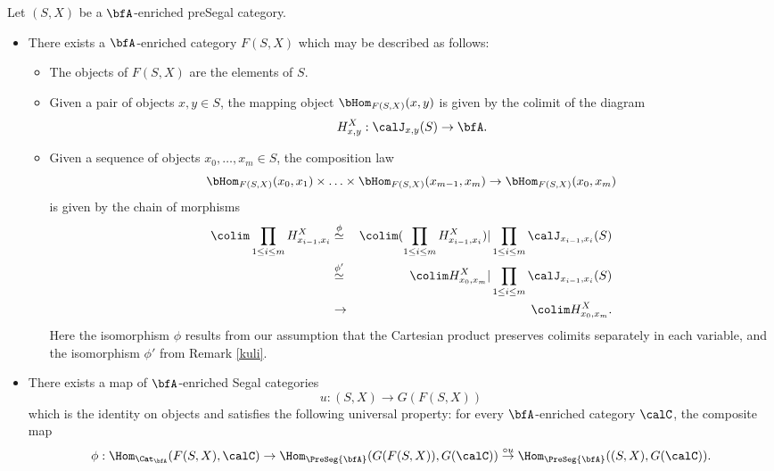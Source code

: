 \begin{proposition}\label{koon}
Let $(S,X)$ be a $\bfA$-enriched preSegal category. 
\begin{itemize}
\item[$(1)$] There exists a $\bfA$-enriched category
$F(S,X)$ which may be described as follows: 
\begin{itemize}
\item[$(a)$] The objects of $F(S,X)$ are the elements of $S$.
\item[$(b)$] Given a pair of objects $x,y \in S$, the mapping object
$\bHom_{F(S,X)}(x,y)$ is given by the colimit of the diagram
$$ H^{X}_{x,y}: \calJ_{x,y}(S) \rightarrow \bfA.$$
\item[$(c)$] Given a sequence of objects $x_0, \ldots, x_m \in S$, the composition law
$$ \bHom_{F(S,X)}(x_0, x_1) \times \ldots \times \bHom_{F(S,X)}(x_{m-1}, x_m)
\rightarrow \bHom_{ F(S,X)}( x_0, x_m)$$
is given by the chain of morphisms
\begin{align*}
\colim \prod_{1 \leq i \leq m} H^{X}_{x_{i-1}, x_i} & \stackrel{\phi}{\simeq} & 
\colim (\prod_{1 \leq i \leq m} H^{X}_{x_{i-1}, x_i}) | \prod_{1 \leq i \leq m} \calJ_{x_{i-1}, x_i}(S) \\
& \stackrel{\phi'}{\simeq} & \colim H^{X}_{x_0, x_m} | \prod_{ 1 \leq i \leq m} \calJ_{x_{i-1}, x_i}(S) \\
& \rightarrow & \colim H^{X}_{x_0, x_m}. \end{align*}
Here the isomorphism $\phi$ results from our assumption that the Cartesian product preserves colimits separately in each variable, and the isomorphism $\phi'$ from Remark \ref{kuli}.
\end{itemize}
\item[$(2)$] There exists a map of $\bfA$-enriched Segal categories
$$ u: (S,X) \rightarrow G( F(S,X) )$$ which is the identity on objects and satisfies the following universal property: for every $\bfA$-enriched category $\calC$,
the composite map
$$ \phi: \Hom_{ \Cat_{\bfA}}( F(S,X), \calC) \rightarrow \Hom_{ \PreSeg{\bfA}}( G( F(S,X) ), G(\calC) )
\stackrel{ \circ u}{\rightarrow} \Hom_{ \PreSeg{\bfA}}( (S,X), G(\calC) ).$$
\end{itemize}
\end{proposition}

